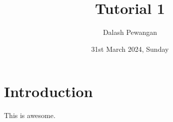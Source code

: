 \documentclass{article}
\title{Tutorial 1}
\author{Dalash Pewangan}
\date{31st March 2024, Sunday}
\begin{document}
\maketitle

\section{Introduction}
This is awesome.
\end{document}
